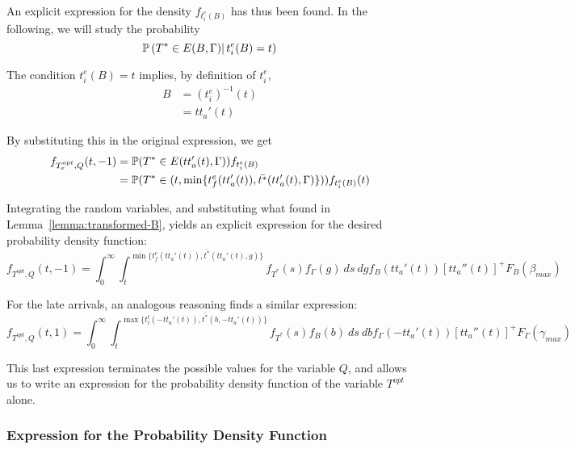 An explicit expression for the density \(f_{t_i^e(B)}\) has thus been found.
In the following, we will study the probability
\begin{equation*}
  \mathbb{P}\left(T^* \in E(B, \Gamma)|\, t_i^e(B) = t\right)
\end{equation*}

The condition \(t_i^e(B) = t\) implies, by definition of \(t_i^e\),
\begin{align*}
  B & = (t_i^e)^{-1}(t) \\
    & = tt_a'(t)
\end{align*}

By substituting this in the original expression, we get
\begin{equation}
  \label{eq:early-subst}
  \begin{split}
    f_{T_e^{opt}, Q}(t, -1) & = \mathbb{P}(T^* \in E(tt_a'(t), \Gamma))f_{t_i^e(B)}\\
    & = \mathbb{P}(T^* \in (t, \min\{t_f^e(tt_a'(t)), \bar{t^*}(tt_a'(t), \Gamma)\}))f_{t_i^e(B)}(t)
  \end{split}
\end{equation}

Integrating the random variables,
and substituting what found in Lemma~\ref{lemma:transformed-B},
yields an explicit expression for the desired probability density function:
\begin{equation}
  \label{eq:early-final}
  f_{T^{opt}, Q}(t, -1) = \int_0^\infty \int_t^{\min\{t_f^e(tt_a'(t)), \bar{t^*}(tt_a'(t), g)\}}f_{T^*}(s) f_\Gamma(g)\ ds\ dg f_B(tt_a'(t)) [tt_a''(t)]^+ F_B(\beta_{max})
\end{equation}

For the late arrivals, an analogous reasoning finds a similar expression:
\begin{equation}
  \label{eq:late-final}
  f_{T^{opt}, Q}(t, 1) = \int_0^\infty \int_t^{\max\{t_i^l(-tt_a'(t)), \bar{t^*}(b, -tt_a'(t))\}}f_{T^*}(s) f_B(b)\ ds\ db f_\Gamma(-tt_a'(t)) [tt_a''(t)]^+ F_\Gamma(\gamma_{max})
\end{equation}

This last expression terminates the possible values for the variable \(Q\),
and allows us to write an expression for the probability density function of the variable \(T^{opt}\) alone.

\subsubsection{Expression for the Probability Density Function}

